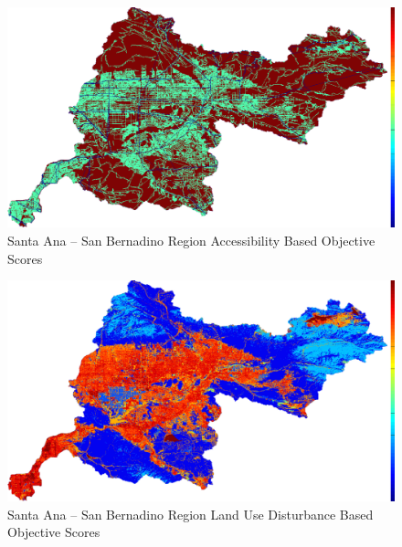         \begin{figure}[!h]
            \begin{center}
            \includegraphics[width=5.5in]{figures/SanBernadino_AccessibilityScore.png}   
            \caption{Santa Ana -- San Bernadino Region Accessibility Based Objective Scores}
            \label{fig:SASBaccessibilty}
            \end{center}
        \end{figure}

        \begin{figure}[!h]
            \begin{center}
            \includegraphics[width=5.5in]{figures/SanBernadino_DisturbanceScore.png}   
            \caption{Santa Ana -- San Bernadino Region Land Use Disturbance Based Objective Scores}
            \label{fig:SASBdisturbance}
            \end{center}
        \end{figure}
        
